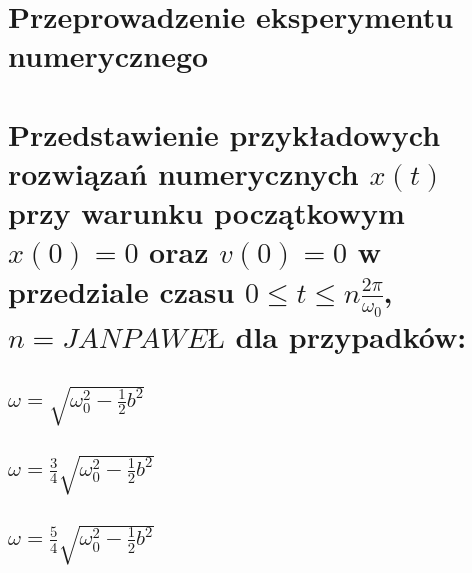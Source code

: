 \documentclass[polish,polish,a4paper]{article}
\begin{document}
		\section{Przeprowadzenie eksperymentu numerycznego}
		
		
		\section{Przedstawienie przykładowych rozwiązań numerycznych $x(t)$ przy warunku początkowym $ x(0) = 0  $ oraz $  v(0)= 0 $ w przedziale czasu $ 0 \leq t \leq n\frac{2\pi}{\omega_{0}}$, $ n = JANPAWEŁ $ dla przypadków:}
		\subsection{$\omega = \sqrt{\omega_{0}^2 - \frac{1}{2}b^2}$}
		\subsection{$\omega = \frac{3}{4}\sqrt{\omega_{0}^2 - \frac{1}{2}b^2}$}
		\subsection{$\omega = \frac{5}{4}\sqrt{\omega_{0}^2 - \frac{1}{2}b^2}$}

	
	
	
	\newpage
\end{document}
